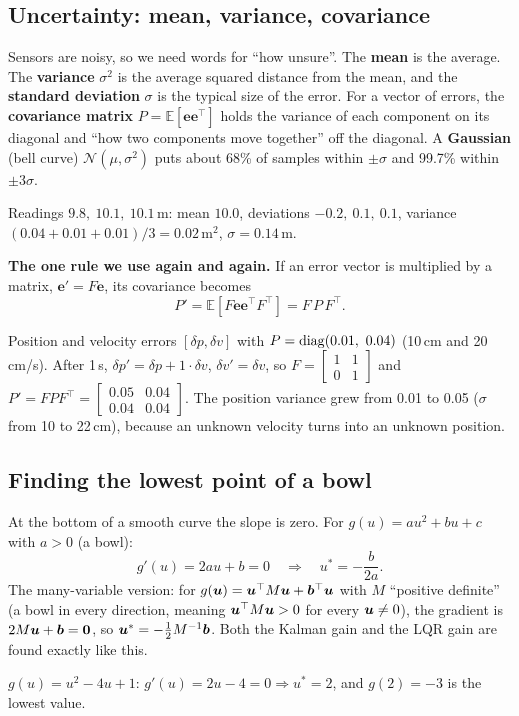\subsection{Uncertainty: mean, variance, covariance}

Sensors are noisy, so we need words for ``how unsure''. The \textbf{mean} is the average. The \textbf{variance}
$\sigma^2$ is the average squared distance from the mean, and the \textbf{standard deviation} $\sigma$ is the typical
size of the error. For a vector of errors, the \textbf{covariance matrix} $P=\mathbb E[\bm e\bm e^\top]$ holds the
variance of each component on its diagonal and ``how two components move together'' off the diagonal.
A \textbf{Gaussian} (bell curve) $\mathcal N(\mu,\sigma^2)$ puts about 68\% of samples within $\pm\sigma$ and 99.7\%
within $\pm3\sigma$.
\begin{toy}
Readings $9.8,\ 10.1,\ 10.1$\,m: mean $10.0$, deviations $-0.2,\ 0.1,\ 0.1$,
variance $(0.04+0.01+0.01)/3=0.02$\,m$^2$, $\sigma=0.14$\,m.
\end{toy}

\textbf{The one rule we use again and again.} If an error vector is multiplied by a matrix, $\bm e'=F\bm e$, its
covariance becomes
\[
P'=\mathbb E[F\bm e\bm e^\top F^\top]=F\,P\,F^\top .
\]
\begin{toy}
Position and velocity errors $[\delta p,\delta v]$ with $P=\operatorname{diag}(0.01,\ 0.04)$ (10\,cm and 20\,cm/s). After 1\,s,
$\delta p'=\delta p+1\cdot\delta v$, $\delta v'=\delta v$, so $F=\begin{bmatrix}1&1\\0&1\end{bmatrix}$ and
$P'=FPF^\top=\begin{bmatrix}0.05&0.04\\0.04&0.04\end{bmatrix}$. The position variance grew from 0.01 to 0.05
($\sigma$ from 10 to 22\,cm), because an unknown velocity turns into an unknown position.
\end{toy}

\subsection{Finding the lowest point of a bowl}
\label{sec:minquad}

At the bottom of a smooth curve the slope is zero. For $g(u)=au^2+bu+c$ with $a>0$ (a bowl):
\[
g'(u)=2au+b=0\quad\Longrightarrow\quad u^*=-\frac{b}{2a}.
\]
The many-variable version: for $g(\bm{u})=\bm{u}^\top M\bm{u}+\bm b^\top\bm{u}$ with $M$ ``positive definite'' (a bowl in every
direction, meaning $\bm{u}^\top M\bm{u}>0$ for every $\bm{u}\neq0$), the gradient is $2M\bm{u}+\bm b=\bm0$, so
$\bm{u}^*=-\tfrac12M^{-1}\bm b$. Both the Kalman gain and the LQR gain are found exactly like this.
\begin{toy}
$g(u)=u^2-4u+1$: $g'(u)=2u-4=0\Rightarrow u^*=2$, and $g(2)=-3$ is the lowest value.
\end{toy}

